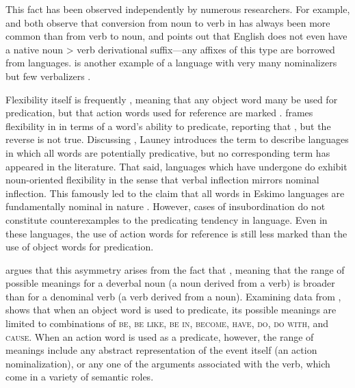 This fact has been observed independently by numerous researchers. For example, \textcite[251]{Stevick1968} and \textcite[373--374]{Marchand1969} both observe that conversion from noun to verb in  has always been more common than from verb to noun, and \textcite[98]{Kastovsky1996} points out that English does not even have a native noun > verb derivational suffix—any affixes of this type are borrowed from  languages.  is another example of a language with very many nominalizers but few verbalizers \parencite[158]{Mithun2017}.

Flexibility itself is frequently , meaning that any object word many be used for predication, but that action words used for reference are marked \parencites[69]{Croft2001b}[§3.3]{EvansOsada2005}{Beck2013}. \textcite[44]{Nakayama2001} frames flexibility in  in terms of a word's ability to predicate, reporting that , but the reverse is not true. Discussing , Launey \parencites*{Launey1994}{Launey2004} introduces the term  to describe languages in which all words are potentially predicative, but no corresponding term  has appeared in the literature. That said, languages which have undergone   do exhibit noun-oriented flexibility in the sense that verbal inflection mirrors nominal inflection. This famously led to the claim that all words in Eskimo languages are fundamentally nominal in nature \parencite{Sadock1999}. However, cases of insubordination do not constitute counterexamples to the predicating tendency in language. Even in these languages, the use of action words for reference is still less marked than the use of object words for predication.

\textcite{Kastovsky1996} argues that this asymmetry arises from the fact that , meaning that the range of possible meanings for a deverbal noun (a noun derived from a verb) is broader than for a denominal verb (a verb derived from a noun). Examining data from , \citeauthor{Kastovsky1996} shows that when an object word is used to predicate, its possible meanings are limited to combinations of \textsc{be}, \textsc{be like}, \textsc{be in}, \textsc{become}, \textsc{have}, \textsc{do}, \textsc{do with}, and \textsc{cause}. When an action word is used as a predicate, however, the range of meanings include any abstract representation of the event itself (an action nominalization), or any one of the arguments associated with the verb, which come in a variety of semantic roles.

